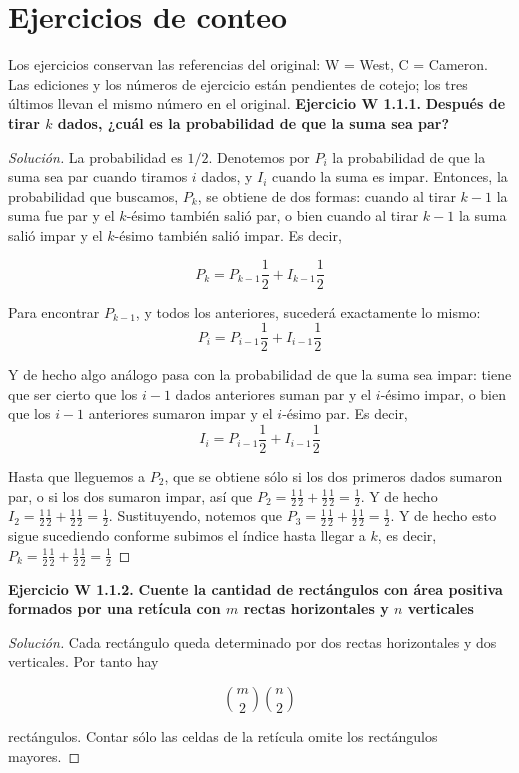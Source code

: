 \section{Ejercicios de conteo}
\label{section-ejercicios-de-conteo}
Los ejercicios conservan las referencias del
original: W = West, C = Cameron. Las
ediciones y los números de ejercicio están
pendientes de cotejo; los tres últimos llevan
el mismo número en el original.
\medskip\noindent\textbf{Ejercicio W  1.1.1.}
\textbf{Después de tirar $k$ dados, ¿cuál es
la probabilidad de que la suma sea par?}
\begin{proof}[Solución]
La probabilidad es $1/2$. Denotemos por $P_i$
la probabilidad de que la suma sea par cuando
tiramos $i$ dados, y $I_i$ cuando la suma es
impar. Entonces, la probabilidad que
buscamos, $P_k$, se obtiene de dos formas:
cuando al tirar $k-1$ la suma fue par y el
$k$-ésimo también salió par, o bien cuando al
tirar $k-1$ la suma salió impar y el
$k$-ésimo también salió impar. Es decir,

$$
P_k=P_{k-1}\frac{1}{2}+I_{k-1}\frac{1}{2}
$$

Para encontrar $P_{k-1}$, y todos los
anteriores, sucederá exactamente lo mismo:
$$
P_i=P_{i-1}\frac{1}{2}+I_{i-1}\frac{1}{2}
$$

Y de hecho algo análogo pasa con la
probabilidad de que la suma sea impar: tiene
que ser cierto que los $i-1$ dados anteriores
suman par y el $i$-ésimo impar, o bien que
los $i-1$ anteriores sumaron impar y el
$i$-ésimo par. Es decir,
$$
I_i=P_{i-1}\frac{1}{2}+I_{i-1}\frac{1}{2}
$$

Hasta que lleguemos a $P_2$, que se obtiene
sólo si los dos primeros dados sumaron par, o
si los dos sumaron impar, así que $P_2 =
\frac{1}{2} \frac{1}{2} +  \frac{1}{2}
\frac{1}{2} =  \frac{1}{2}$. Y de hecho $I_2
=  \frac{1}{2} \frac{1}{2} +  \frac{1}{2}
\frac{1}{2} =  \frac{1}{2}$. Sustituyendo,
notemos que $P_3 =  \frac{1}{2} \frac{1}{2} +
\frac{1}{2} \frac{1}{2} =  \frac{1}{2}$. Y de
hecho esto sigue sucediendo conforme subimos
el índice hasta llegar a $k$, es decir, $P_k
=  \frac{1}{2} \frac{1}{2} +  \frac{1}{2}
\frac{1}{2} =  \frac{1}{2}$
\end{proof}

\medskip\noindent\textbf{Ejercicio W 1.1.2.}
\textbf{Cuente la cantidad de rectángulos con
área positiva formados por una retícula con
$m$ rectas horizontales y $n$ verticales}
\begin{proof}[Solución]
Cada rectángulo queda determinado por dos
rectas horizontales y dos verticales. Por
tanto hay

$$
{m\choose2}{n\choose2}
$$

rectángulos. Contar sólo las celdas de la
retícula omite los rectángulos mayores.
\end{proof}


